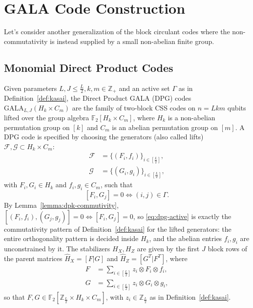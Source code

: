 \section{GALA Code Construction}\label{sec:construction}
Let's consider another generalization of the block circulant codes where the non-commutativity is instead supplied by a small non-abelian finite group.


\subsection{Monomial Direct Product Codes}\label{ssec:mono-gala}
\begin{definition}\label{def:dpg-code}
Given parameters $L, J\leq \tfrac L2, k, m\in\mathbb Z_+$ and an active set $\Gamma$ as in Definition~\ref{def:kasai}, the Direct Product GALA (DPG) codes $\mathrm{GALA}_{L,J}(H_k\times C_m)$ are the family of two-block CSS codes on $n = Lkm$ qubits lifted over the group algebra $\mathbb F_2[H_k\times C_m]$, where $H_k$ is a non-abelian permutation group on $[k]$ and $C_m$ is an abelian permutation group on $[m]$. A DPG code is specified by choosing the generators (also called lifts) $\mathcal{F},\mathcal{G}\subset H_k\times C_m$:
\begin{align*}
    \mathcal{F} &= \{(F_i, f_{i})\}_{i\in[\frac L2]},\\
    \mathcal{G} &= \{(G_i, {g}_i)\}_{i\in[\frac L2]},
\end{align*}
with $F_i, G_i\in H_k$ and $f_i,g_i\in C_m$, such that
\begin{equation}\label{eq:dpg-active}
    [F_i, G_j] = 0\iff (i,j)\in \Gamma .
\end{equation}
By Lemma~\ref{lemma:dpk-commutivity}, $[(F_i,f_i),(G_j,g_j)] = 0\iff [F_i,G_j] = 0$, so \eqref{eq:dpg-active} is exactly the commutativity pattern of Definition~\ref{def:kasai} for the lifted generators: the entire orthogonality pattern is decided inside $H_k$, and the abelian entries $f_i,g_i$ are unconstrained by it. The stabilizers $ H_X, {H}_Z$ are given by the first $J$ block rows of the parent matrices $\hat H_X = [F|G]$ and $\hat H_Z = [G^T|F^T]$, where
\begin{align*}
    F &= \sum_{i\in [\frac{L}{2}]} z_i\otimes F_i\otimes f_i ,\\
    G &= \sum_{i\in [\frac{L}{2}]} z_i\otimes G_i\otimes g_i,
\end{align*}
so that $F,G\in \mathbb F_2[\mathbb Z_{\frac L2}\times H_k\times C_m]$, with $z_i\in\mathbb Z_{\frac L2}$ as in Definition~\ref{def:kasai}.
\end{definition}


